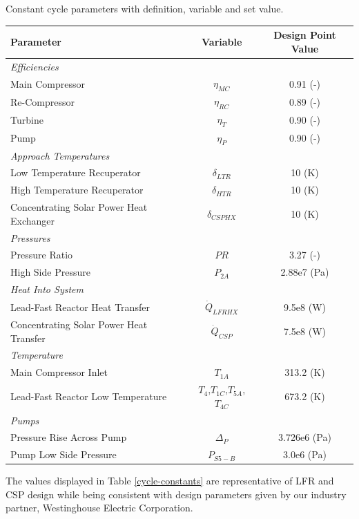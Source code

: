 \begin{specialtable}[H] 
    \caption{Constant cycle parameters with definition, variable and set value. \label{cycle-constants}}
    \begin{tabular}{lcc}
    \toprule
    \textbf{Parameter} & \textbf{Variable}	& \textbf{Design Point Value}\\
    \midrule
    \textit{Efficiencies}\\
    Main Compressor & $\eta_{MC}$		& 0.91 (-)\\
    Re-Compressor & $\eta_{RC}$		& 0.89 (-)\\
    Turbine & $\eta_{T}$		& 0.90 (-)\\
    Pump & $\eta_{P}$      & 0.90 (-)\\
    \midrule
    \textit{Approach Temperatures}\\
    Low Temperature Recuperator & $\delta_{LTR}$		& 10 (K)\\
    High Temperature Recuperator & $\delta_{HTR}$		& 10 (K)\\
    Concentrating Solar Power Heat Exchanger & $\delta_{CSPHX}$	& 10 (K)\\
    \midrule
    \textit{Pressures}\\
    Pressure Ratio & $PR$ & 3.27 (-)\\
    High Side Pressure & $P_{2A}$ & 2.88e7 (Pa)\\
    \midrule
    \textit{Heat Into System}\\
    Lead-Fast Reactor Heat Transfer & $\dot{Q}_{LFRHX}$ & 9.5e8 (W)\\
    Concentrating Solar Power Heat Transfer & $\dot{Q}_{CSP}$ & 7.5e8 (W)\\
    \midrule
    \textit{Temperature}\\
    Main Compressor Inlet & $T_{1A}$ & 313.2 (K)\\
    Lead-Fast Reactor Low Temperature & $T_{4}$,$T_{1C}$,$T_{5A}$,$T_{4C}$ & 673.2 (K)\\
    \midrule
    \textit{Pumps}\\
    Pressure Rise Across Pump & $\Delta_{P}$ & 3.726e6 (Pa)\\
    Pump Low Side Pressure & $P_{S5-B}$ & 3.0e6 (Pa)\\ 
    \bottomrule
    \end{tabular}
\end{specialtable}

The values displayed in Table \ref{cycle-constants} are representative of LFR and CSP design while being consistent with design parameters given by our industry partner, Westinghouse Electric Corporation.


